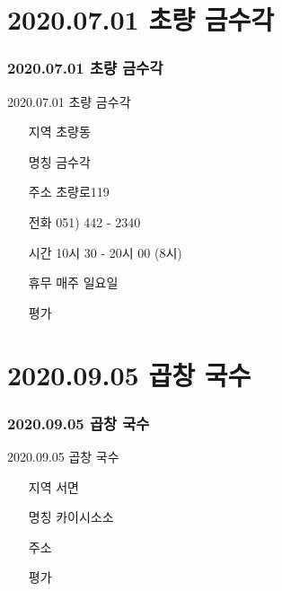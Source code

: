 \documentclass[aspectratio=1610,17pt,xcolor=pdftex,dvipsnames,table,handout]{beamer}
\begin{document}
		\section{ 2020.07.01 초량 금수각 }
		\begin{frame} [t,plain]
		\frametitle{ 2020.07.01 초량 금수각 }
			\begin{block} { 2020.07.01 초량 금수각 }
			\setlength{\leftmargini}{4em}			
			\begin{itemize}
				\item [지역] 초량동
				\item [명칭] 금수각
				\item [주소] 초량로119
				\item [전화] 051) 442 - 2340
				\item [시간] 10시 30 - 20시 00 (8시)
				\item [휴무] 매주 일요일
				\item [평가] 
			\end{itemize}
			\end{block}						
		\end{frame}						

		\section{ 2020.09.05 곱창 국수 }
		\begin{frame} [t,plain]
		\frametitle{ 2020.09.05 곱창 국수 }
			\begin{block} { 2020.09.05 곱창 국수 }
			\setlength{\leftmargini}{4em}			
			\begin{itemize}
				\item [지역] 서면
				\item [명칭] 카이시소소
				\item [주소] 
				\item [평가] 
			\end{itemize}
			\end{block}						
		\end{frame}						


\end{document}
